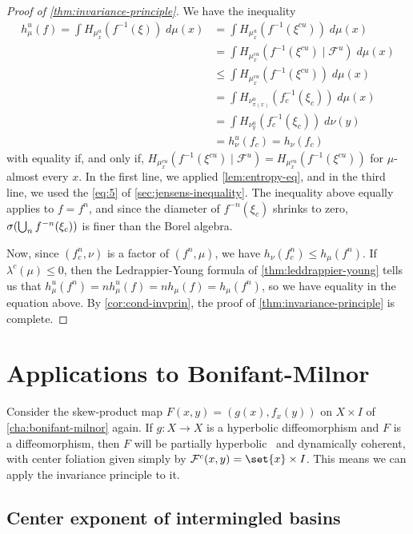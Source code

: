 \documentclass[../main]{subfiles}
\begin{document}
\begin{proof}[Proof of \cref{thm:invariance-principle}]
We have the inequality
\begin{align*}
  h_{\mu}^u(f)
  = \int H_{\mu_{x}^u}(f^{-1}(\xi))\;d\mu(x)
  &= \int H_{\mu_{x}^u}(f^{-1}(\xi^{cu}))\;d\mu(x)\\
  &= \int H_{\mu_{x}^{cu}}(f^{-1}(\xi^{cu}) \mid \mathcal{F}^u)\;d\mu(x)\\
  &\le \int H_{\mu^{cu}_x}(f^{-1}(\xi^{cu}))\;d\mu(x)\\
  &=  \int H_{\nu^{u}_{\pi(x)}}(f_c^{-1}(\xi_c))\;d\mu(x)\\
  &=  \int H_{\nu^{u}_{y}}(f_c^{-1}(\xi_c))\;d\nu(y)\\
  &= h^u_{\nu}(f_c) = h_{\nu}(f_c)
\end{align*}
with equality if, and only if, \(H_{\mu_{x}^{cu}}(f^{-1}(\xi^{cu}) \mid \mathcal{F}^u) = H_{\mu^{cu}_x}(f^{-1}(\xi^{cu}))\) for \(\mu\)-almost every \(x\).
In the first line, we applied \cref{lem:entropy-eq}, and in the third line, we used  the \cref{eq:5} of \cref{sec:jensens-inequality}. The inequality above equally applies to \(f = f^n\), and since the diameter of \(f^{-n}(\xi_c)\) shrinks to zero, \(\sigma\rpar*{\bigcup_nf^{-n}(\xi_c)}\) is finer than the Borel algebra.

Now, since \((f^n_c, \nu)\) is a factor of \((f^n,\mu)\), we have \(h_{\nu}(f_c^n) \le h_{\mu}(f^n)\). If \(\lambda^c(\mu) \le 0\), then the Ledrappier-Young formula of \cref{thm:leddrappier-young} tells us that \(h_{\mu}^u(f^n) = n h_{\mu}^u(f) = n h_{\mu}(f) = h_{\mu}(f^n)\), so we have equality in the equation above. By \cref{cor:cond-invprin}, the proof of \cref{thm:invariance-principle} is complete.
\end{proof}

\section{Applications to Bonifant-Milnor}

Consider the skew-product map \(F(x,y) = (g(x),f_x(y))\) on \(X \times I\) of \cref{cha:bonifant-milnor} again. If \(g \colon X \to X\) is a hyperbolic diffeomorphism and \(F\) is a diffeomorphism, then \(F\) will be partially hyperbolic~\cite{crovisierIntroductionPartiallyHyperbolic} and dynamically coherent, with center foliation given simply by \(\mathcal{F}^c(x,y) = \set{x} \times I\). This means we can apply the invariance principle to it.

\subsection{Center exponent of intermingled basins}
\end{document}
